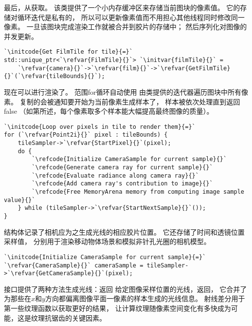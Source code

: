 最后，从获取。
该类提供了一个小内存缓冲区来存储当前图块的像素值。
它的存储对循环迭代是私有的，
所以可以更新像素值而不用担心其他线程同时修改同一像素。
一旦该图块完成渲染工作就被合并到胶片的存储中；
然后序列化对图像的并发更新。
\begin{lstlisting}
`\initcode{Get FilmTile for tile}{=}`
std::unique_ptr<`\refvar{FilmTile}{}`> `\initvar{filmTile}{}` =
    `\refvar{camera}{}`->`\refvar{film}{}`->`\refvar{GetFilmTile}{}`(`\refvar{tileBounds}{}`);
\end{lstlisting}

现在可以进行渲染了。
范围{\ttfamily for}循环自动使用
由类提供的迭代器遍历图块中所有像素。
复制的会被通知要开始为当前像素生成样本了，
样本被依次处理直到返回{\ttfamily false}
（如第所述，每个像素取多个样本能大幅提高最终图像的质量）。

\begin{lstlisting}
`\initcode{Loop over pixels in tile to render them}{=}`
for (`\refvar{Point2i}{}` pixel : tileBounds) {
    tileSampler->`\refvar{StartPixel}{}`(pixel);
    do {
        `\refcode{Initialize CameraSample for current sample}{}`
        `\refcode{Generate camera ray for current sample}{}`
        `\refcode{Evaluate radiance along camera ray}{}`
        `\refcode{Add camera ray's contribution to image}{}`
        `\refcode{Free MemoryArena memory from computing image sample value}{}`
    } while (tileSampler->`\refvar{StartNextSample}{}`());
}
\end{lstlisting}

结构体记录了相机应为之生成光线的相应胶片位置。
它还存储了时间和透镜位置采样值，
分别用于渲染移动物体场景和模拟非针孔光圈的相机模型。
\begin{lstlisting}
`\initcode{Initialize CameraSample for current sample}{=}`
`\refvar{CameraSample}{}` cameraSample = tileSampler->`\refvar{GetCameraSample}{}`(pixel);
\end{lstlisting}

接口提供了两种方法生成光线：返回
给定图像采样位置的光线，返回，
它合并了为那些在$x$和$y$方向都偏离图像平面一像素的样本生成的光线信息。
射线差分用于第一些纹理函数以获取更好的结果，
让计算纹理随像素空间变化有多快成为可能，这是纹理抗锯齿的关键因素。

